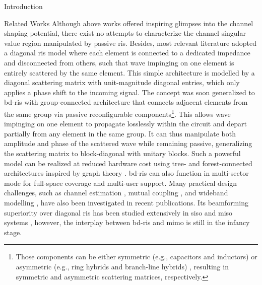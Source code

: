 \documentclass[journal]{IEEEtran}
\begin{document}
\begin{section}{Introduction}
\begin{subsection}{Related Works}
		Although above works offered inspiring glimpses into the channel shaping potential,
		there exist no attempts to characterize the channel singular value region manipulated by passive \gls{ris}.
		Besides, most relevant literature \cite{ElMossallamy2021,Meng2023,Zheng2022,Huang2023,Bafghi2022,Zheng2023,Chae2023,Wu2019,Santamaria2023a} adopted a diagonal \gls{ris} model where each element is connected to a dedicated impedance and disconnected from others, such that wave impinging on one element is entirely scattered by the same element.
		This simple architecture is modelled by a diagonal scattering matrix with unit-magnitude diagonal entries, which only applies a phase shift to the incoming signal.
		The concept was soon generalized to \gls{bd}-\gls{ris} with group-connected architecture \cite{Shen2020a} that connects adjacent elements from the same group via  passive reconfigurable components\footnote{Those components can be either symmetric (e.g., capacitors and inductors) or asymmetric (e.g., ring hybrids and branch-line hybrids) \cite{Ahn2006}, resulting in symmetric and asymmetric scattering matrices, respectively.\label{fn:symmetric}}.
		This allows wave impinging on one element to propagate losslessly within the circuit and depart partially from any element in the same group.
		It can thus manipulate both amplitude and phase of the scattered wave while remaining passive, generalizing the scattering matrix to block-diagonal with unitary blocks.
		Such a powerful model can be realized at reduced hardware cost using tree- and forest-connected architectures inspired by graph theory \cite{Nerini2024}.
		\gls{bd}-\gls{ris}
		can also function in
		multi-sector mode \cite{Li2023c} for full-space coverage and multi-user support.
		Many practical design challenges, such as channel estimation \cite{Li2024}, mutual coupling \cite{Li2023f}, and wideband modelling \cite{Li2024a}, have also been investigated in recent publications.
		Its beamforming superiority over diagonal \gls{ris} has been studied extensively in \gls{siso} and \gls{miso} systems \cite{Shen2020a,Nerini2023,Nerini2024,Santamaria2023,Fang2023,Zhou2023,Li2023c,Soleymani2024}, however, the interplay between \gls{bd}-\gls{ris} and \gls{mimo} is still in the infancy stage.

\end{subsection}
\end{section}
\end{document}
